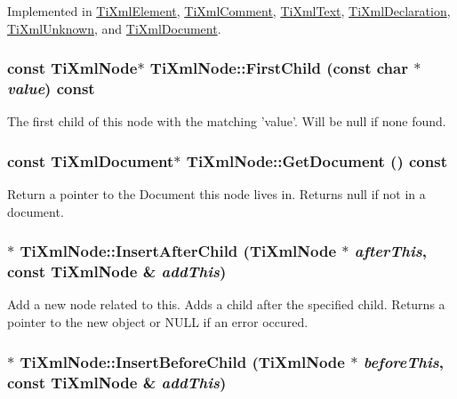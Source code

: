 Implemented in \hyperlink{class_ti_xml_element_aa464535ea1994db337cb6a8ce4b588b5}{TiXmlElement}, \hyperlink{class_ti_xml_comment_a0d6662bdc52488b9e12b3c7a0453d028}{TiXmlComment}, \hyperlink{class_ti_xml_text_a0c411e93a27537369479d034cc82da3b}{TiXmlText}, \hyperlink{class_ti_xml_declaration_a7cf459186040141cda7a180a6585ce2e}{TiXmlDeclaration}, \hyperlink{class_ti_xml_unknown_a0960bb7428b3f341da46244229604d73}{TiXmlUnknown}, and \hyperlink{class_ti_xml_document_a4968661cab4a1f44a23329c6f8db1907}{TiXmlDocument}.\hypertarget{class_ti_xml_node_a1f05828d023150706eeb16d6fb3f6355}{
\subsubsection[{FirstChild}]{\setlength{\rightskip}{0pt plus 5cm}const {\bf TiXmlNode}$\ast$ TiXmlNode::FirstChild (const char $\ast$ {\em value}) const}}
\label{class_ti_xml_node_a1f05828d023150706eeb16d6fb3f6355}
The first child of this node with the matching 'value'. Will be null if none found. \hypertarget{class_ti_xml_node_a80e397fa973cf5323e33b07154b024f3}{
\subsubsection[{GetDocument}]{\setlength{\rightskip}{0pt plus 5cm}const {\bf TiXmlDocument}$\ast$ TiXmlNode::GetDocument () const}}
\label{class_ti_xml_node_a80e397fa973cf5323e33b07154b024f3}
Return a pointer to the Document this node lives in. Returns null if not in a document. \hypertarget{class_ti_xml_node_ad9b75e54ec19301c8b4d5ff583d0b3d5}{
\subsubsection[{InsertAfterChild}]{$\ast$ TiXmlNode::InsertAfterChild ({\bf TiXmlNode} $\ast$ {\em afterThis}, \/  const {\bf TiXmlNode} \& {\em addThis})}}
\label{class_ti_xml_node_ad9b75e54ec19301c8b4d5ff583d0b3d5}
Add a new node related to this. Adds a child after the specified child. Returns a pointer to the new object or NULL if an error occured. \hypertarget{class_ti_xml_node_a0c146fa2fff0157b681594102f48cbc7}{
\subsubsection[{InsertBeforeChild}]{$\ast$ TiXmlNode::InsertBeforeChild ({\bf TiXmlNode} $\ast$ {\em beforeThis}, \/  const {\bf TiXmlNode} \& {\em addThis})}}
